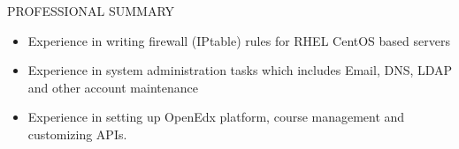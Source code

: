 \documentclass{resume} %
\begin{document}
\begin{rSection}{PROFESSIONAL SUMMARY}
\begin{itemize}
  \item Experience in writing firewall (IPtable) rules for
    RHEL CentOS based servers
    
  \item Experience in system administration tasks which includes
    Email, DNS, LDAP and other account maintenance
    
  \item Experience in setting up OpenEdx platform, course
    management and customizing APIs.

  \end{itemize}

\end{rSection}

\end{document}
